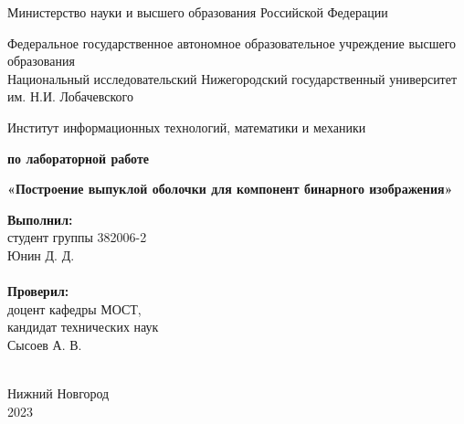 \documentclass{report}
\begin{document}
\begin{titlepage}

\begin{center}
Министерство науки и высшего образования Российской Федерации
\end{center}

\begin{center}
Федеральное государственное автономное образовательное учреждение высшего образования \\
Национальный исследовательский Нижегородский государственный университет им. Н.И. Лобачевского
\end{center}

\begin{center}
Институт информационных технологий, математики и механики
\end{center}

\vspace{4em}

\begin{center}
\textbf{ по лабораторной работе} \\
\end{center}
\begin{center}
\textbf{\Large«Построение выпуклой оболочки для компонент бинарного изображения»} \\
\end{center}

\vspace{4em}

\newbox{\lbox}
\newlength{\maxl}
\setlength{\maxl}{\wd\lbox}
\hfill\parbox{7cm}{
\hspace*{5cm}\hspace*{-5cm}\textbf{Выполнил:} \\ студент группы 382006-2 \\ Юнин Д. Д.\\
\\
\hspace*{5cm}\hspace*{-5cm}\textbf{Проверил:}\\ доцент кафедры МОСТ, \\ кандидат технических наук \\ Сысоев А. В.\\\
}
\vspace{\fill}

\begin{center} Нижний Новгород \\ 2023 \end{center}

\end{titlepage}
\end{document}
